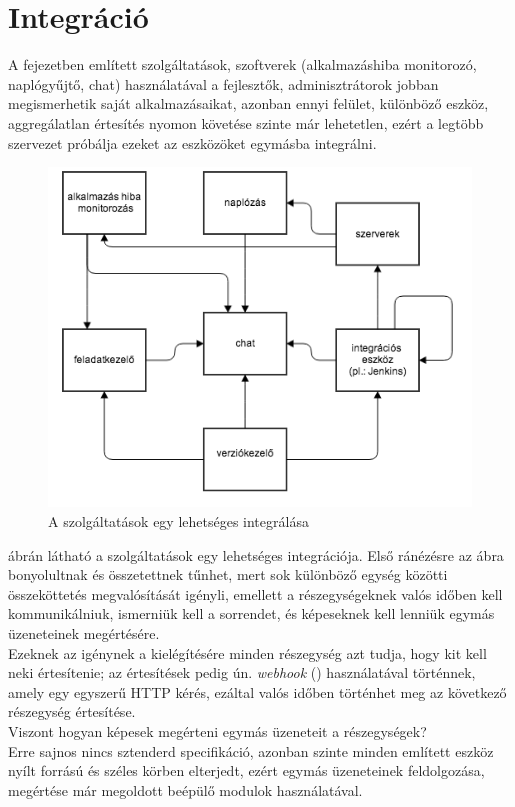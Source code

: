 \section{Integráció}
\label{section:service_integration}
A fejezetben említett szolgáltatások, szoftverek (alkalmazáshiba monitorozó, naplógyűjtő, chat) használatával a fejlesztők, adminisztrátorok jobban megismerhetik saját alkalmazásaikat, azonban ennyi felület, különböző eszköz, aggregálatlan értesítés nyomon követése szinte már lehetetlen, ezért a legtöbb szervezet próbálja ezeket az eszközöket egymásba integrálni.
\begin{figure}[H]
	\centering
		\includegraphics[scale=1.0]{assets/integrated_services.png}%
		\caption[DUMMY]%
		{A szolgáltatások egy lehetséges integrálása}%
		\label{fig:integrated-services}
\end{figure}
 ábrán látható a szolgáltatások egy lehetséges integrációja. Első ránézésre az ábra bonyolultnak és összetettnek tűnhet, mert sok különböző egység közötti összeköttetés megvalósítását igényli, emellett a részegységeknek valós időben kell kommunikálniuk, ismerniük kell a sorrendet, és képeseknek kell lenniük egymás üzeneteinek megértésére.\\
Ezeknek az igénynek a kielégítésére minden részegység azt tudja, hogy kit kell neki értesítenie; az értesítések pedig ún. \emph{webhook} (\cite{web_hook}) használatával történnek, amely egy egyszerű HTTP kérés, ezáltal valós időben történhet meg az következő részegység értesítése.\\
Viszont hogyan képesek megérteni egymás üzeneteit a részegységek?\\
Erre sajnos nincs sztenderd specifikáció, azonban szinte minden említett eszköz nyílt forrású és széles körben elterjedt, ezért egymás üzeneteinek feldolgozása, megértése már megoldott beépülő modulok használatával.\\

